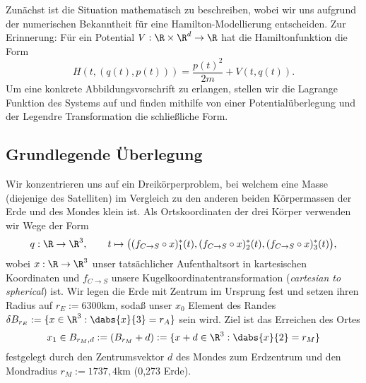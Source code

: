 \documentclass{subfiles}
\begin{document}
    

    Zunächst ist die Situation mathematisch zu beschreiben, wobei wir uns aufgrund der numerischen Bekanntheit für eine Hamilton-Modellierung entscheiden. Zur Erinnerung: Für ein Potential $V:\R\times\R^d\to\R$ hat die Hamiltonfunktion die Form 
    \[
        H(t,(q(t),p(t))) = \frac{p(t)^2}{2m} + V(t,q(t)).
    \]
    Um eine konkrete Abbildungsvorschrift zu erlangen, stellen wir die Lagrange Funktion des Systems auf und finden mithilfe von einer Potentialüberlegung und der Legendre Transformation die schließliche Form. 

    \subsection*{Grundlegende Überlegung}
        Wir konzentrieren uns auf ein Dreikörperproblem, bei welchem eine Masse (diejenige des Satelliten) im Vergleich zu den anderen beiden Körpermassen der Erde und des Mondes klein ist. Als Ortskoordinaten der drei Körper verwenden wir Wege der Form 
        \[
            q:\R\to\R^3,\qquad t\mapsto \bigl((f_{C\to S}\circ x)_1^*(t),(f_{C\to S}\circ x)_2^*(t),(f_{C\to S}\circ x)_3^*(t)\bigr),
        \]
        wobei $x:\R\to\R^3$ unser tatsächlicher Aufenthaltsort in kartesischen Koordinaten und $f_{C\to S}$ unsere Kugelkoordinatentransformation (\emph{cartesian to spherical}) ist. Wir legen die Erde mit Zentrum im Ursprung fest und setzen ihren Radius auf $r_E:=6300\si{\kilo\metre}$, sodaß unser $x_0$ Element des Randes $\delta B_{r_E}:=\{x\in\R^3:\dabs{x}{3} = r_A\}$ sein wird. Ziel ist das Erreichen des Ortes
        \[
            x_1\in B_{r_M,d}:=(B_{r_M}+d):=\{x + d\in\R^3:\dabs{x}{2} = r_M\}
        \]
        festgelegt durch den Zentrumsvektor $d$ des Mondes zum Erdzentrum und den Mondradius $r_M:=1 737,4\si{\kilo\metre}$ (0,273 Erde).
\end{document}
